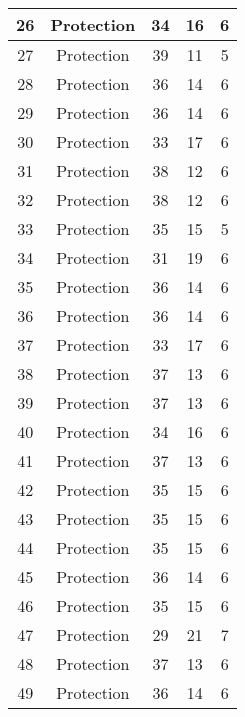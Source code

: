 \documentclass[results.tex]{subfiles}
\begin{document}
\begin{center}
\begin{tabular}{| c || c | c | c | c |}
    \hline
    26 & Protection & 34 & 16 & 6 \\ 
    \hline
    27 & Protection & 39 & 11 & 5 \\ 
    \hline
    28 & Protection & 36 & 14 & 6 \\ 
    \hline
    29 & Protection & 36 & 14 & 6 \\ 
    \hline
    30 & Protection & 33 & 17 & 6 \\ 
    \hline
    31 & Protection & 38 & 12 & 6 \\ 
    \hline
    32 & Protection & 38 & 12 & 6 \\ 
    \hline
    33 & Protection & 35 & 15 & 5 \\ 
    \hline
    34 & Protection & 31 & 19 & 6 \\ 
    \hline
    35 & Protection & 36 & 14 & 6 \\ 
    \hline
    36 & Protection & 36 & 14 & 6 \\ 
    \hline
    37 & Protection & 33 & 17 & 6 \\ 
    \hline
    38 & Protection & 37 & 13 & 6 \\ 
    \hline
    39 & Protection & 37 & 13 & 6 \\ 
    \hline
    40 & Protection & 34 & 16 & 6 \\ 
    \hline
    41 & Protection & 37 & 13 & 6 \\ 
    \hline
    42 & Protection & 35 & 15 & 6 \\ 
    \hline
    43 & Protection & 35 & 15 & 6 \\ 
    \hline
    44 & Protection & 35 & 15 & 6 \\ 
    \hline
    45 & Protection & 36 & 14 & 6 \\ 
    \hline
    46 & Protection & 35 & 15 & 6 \\ 
    \hline
    47 & Protection & 29 & 21 & 7 \\ 
    \hline
    48 & Protection & 37 & 13 & 6 \\ 
    \hline
    49 & Protection & 36 & 14 & 6 \\ 
    \hline   \end{tabular}
\end{center}
\end{document}
